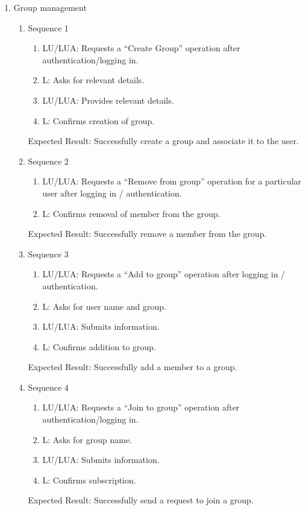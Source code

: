 \documentclass[11pt]{report} %
\begin{document}
\begin{enumerate}
\item
	Group management
		\begin{enumerate}
			\item
				Sequence 1
					\begin{enumerate}
						\item
							LU/LUA: Requests a ``Create Group'' operation after authentication/logging in.
						\item
							L: Asks for relevant details.
						\item
							LU/LUA: Provides relevant details.
						\item
							L: Confirms creation of group.
					\end{enumerate}
				Expected Result: Successfully create a group and associate it to the user.
			\item
				Sequence 2
					\begin{enumerate}
						\item
							LU/LUA: Requests a ``Remove from group'' operation for a particular user after logging in / authentication.
						\item
							L: Confirms removal of member from the group.
					\end{enumerate}
				Expected Result: Successfully remove a member from the group.
			\item
				Sequence 3
					\begin{enumerate}
						\item
							LU/LUA: Requests a ``Add to group'' operation after logging in / authentication.
						\item
							L: Asks for user name and group.
						\item
							LU/LUA: Submits information.
						\item
							L: Confirms addition to group.
					\end{enumerate}
				Expected Result: Successfully add a member to a group.
			\item
				Sequence 4
					\begin{enumerate}
						\item
							LU/LUA: Requests a ``Join to group'' operation after authentication/logging in.
						\item
							L: Asks for group name.
						\item
							LU/LUA: Submits information.
						\item
							L: Confirms subscription.
					\end{enumerate}
				Expected Result: Successfully send a request to join a group.

\end{enumerate}
\end{enumerate}
\end{document}

